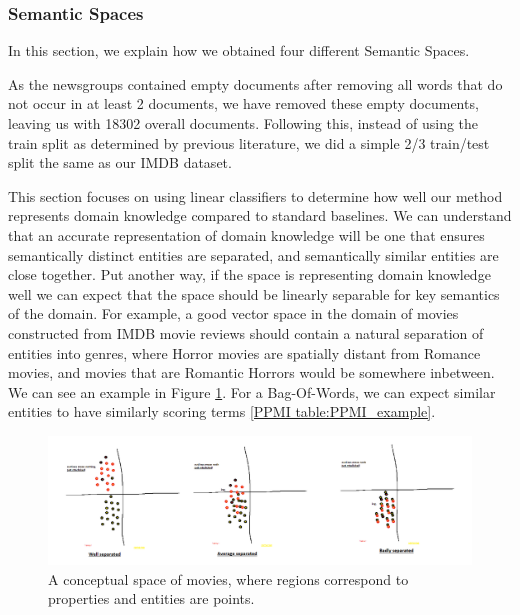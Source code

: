 \subsubsection{Semantic Spaces}
In this section, we explain how we obtained four different Semantic Spaces. \label{ch3:Method}

As the newsgroups contained empty documents after removing all words that do not occur in at least 2 documents, we have removed these empty documents, leaving us with 18302 overall documents. Following this, instead of using the train split as determined by previous literature, we did a simple 2/3 train/test split the same as our IMDB dataset.

This section focuses on using linear classifiers to determine how well our method represents domain knowledge compared to standard baselines. We can understand that an accurate representation of domain knowledge will be one that ensures semantically distinct entities are separated, and semantically similar entities are close together. Put another way, if the space is representing domain knowledge well we can expect that the space should be linearly separable for key semantics of the domain. For example, a good vector space in the domain of movies constructed from IMDB movie reviews should contain a natural separation of entities into genres, where Horror movies are spatially distant from Romance movies, and movies that are Romantic Horrors would be somewhere inbetween. We can see an example in Figure \ref{figure:genres_separated}. For a Bag-Of-Words, we can expect similar entities to have similarly scoring terms \ref{PPMI table:PPMI_example}.

\begin{figure}[t]
	\includegraphics[width=\textwidth]{images/genres_separated.png}
	\centering
	\caption{A conceptual space of movies, where regions correspond to properties and entities are points.}\label{figure:genres_separated}
\end{figure}


